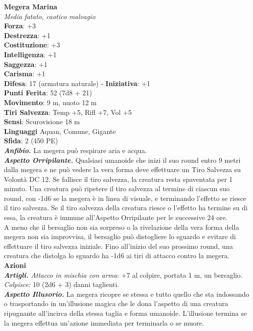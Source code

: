\begin{multicols}{2}
\medskip\textbf{Megera Marina}\\
\emph{Media fatato, caotico malvagio}\\
\textbf{Forza}: +3\\
\textbf{Destrezza}: +1\\
\textbf{Costituzione}: +3\\
\textbf{Intelligenza}: +1\\
\textbf{Saggezza}: +1\\
\textbf{Carisma}: +1\\
\textbf{Difesa}: 17 (armatura naturale) - \textbf{Iniziativa}: +1\\
\textbf{Punti Ferita}: 52 (7d8 + 21)\\
\textbf{Movimento}: 9 m, nuoto 12 m\\
\textbf{Tiri Salvezza}: Temp +5, Rifl +7, Vol +5\\
\textbf{Sensi}: Scurovisione 18 m\\
\textbf{Linguaggi} Aquan, Comune, Gigante\\
\textbf{Sfida}: 2 (450 PE)\smallskip\\
\emph{\textbf{Anfibio.}} La megera può respirare aria e acqua.\\
\emph{\textbf{Aspetto Orripilante.}} Qualsiasi umanoide che inizi il suo round entro 9 metri dalla megera e ne può vedere la vera forma deve effettuare un Tiro Salvezza su Volontà DC  12. Se fallisce il tiro salvezza, la creatura resta spaventata per 1 minuto. Una creatura può ripetere il tiro salvezza al termine di ciascun suo round, con -1d6 se la megera è in linea di visuale, e terminando l'effetto se riesce il tiro salvezza. Se il tiro salvezza della creatura riesce o l'effetto ha termine su di essa, la creatura è immune all'Aspetto Orripilante per le successive 24 ore.\\
A meno che il bersaglio non sia sorpreso o la rivelazione della vera forma della megera non sia improvvisa, il bersaglio può distogliere lo sguardo e evitare di effettuare il tiro salvezza iniziale. Fino all'inizio del suo prossimo round, una creatura che distolga lo sguardo ha -1d6 ai tiri di attacco contro la megera.\\
\smallskip\textbf{Azioni}\\
\emph{\textbf{Artigli.} Attacco in mischia con arma}: +7 al colpire, portata 1 m, un bersaglio.\\
\emph{Colpisce:} 10 (2d6 + 3) danni taglienti.\\
\emph{\textbf{Aspetto Illusorio.}} La megera ricopre se stessa e tutto quello che sta indossando o trasportando in un'illusione magica che le dona l'aspetto di una creatura ripugnante all'incirca della stessa taglia e forma umanoide. L'illusione termina se la megera effettua un'azione immediata per terminarla o se muore.\\


\end{multicols}
